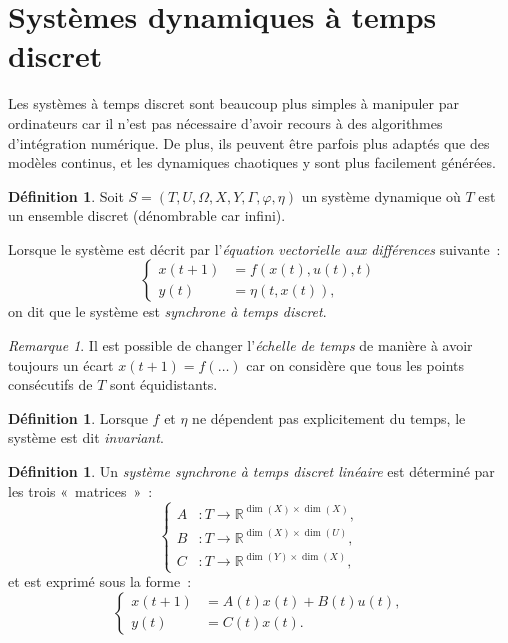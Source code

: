 \documentclass{article}
\theoremstyle{definition}
\newtheorem{déf}[thm]{Définition}
\theoremstyle{remark}
\newtheorem*{rmq}{Remarque}
\newcommand{\R}{\mathbb R}
\begin{document}
\section{Systèmes dynamiques à temps discret}
	Les systèmes à temps discret sont beaucoup plus simples à manipuler par ordinateurs car il n'est pas nécessaire d'avoir recours à des algorithmes
	d'intégration numérique. De plus, ils peuvent être parfois plus adaptés que des modèles continus, et les dynamiques chaotiques y sont plus facilement
	générées.

	\begin{déf} Soit $S = (T, U, \Omega, X, Y, \Gamma, \varphi, \eta)$ un système dynamique où $T$ est un ensemble discret (dénombrable car infini).

	Lorsque le système est décrit par l'\textit{équation vectorielle aux différences} suivante~:
	\[\begin{cases}
		x(t+1) &= f(x(t), u(t), t) \\
		y(t) &= \eta(t, x(t)),
	\end{cases}\]
	on dit que le système est \textit{synchrone à temps discret}.
	\end{déf}

	\begin{rmq} Il est possible de changer l'\textit{échelle de temps} de manière à avoir toujours un écart $x(t+1) = f(\ldots)$ car on considère que tous les
	points consécutifs de $T$ sont équidistants.
	\end{rmq}

	\begin{déf} Lorsque $f$ et $\eta$ ne dépendent pas explicitement du temps, le système est dit \textit{invariant}.
	\end{déf}

	\begin{déf} Un \textit{système synchrone à temps discret linéaire} est déterminé par les trois «~matrices~»~:
	\[\begin{cases}
		A &: T \to \R^{\dim(X) \times \dim(X)}, \\
		B &: T \to \R^{\dim(X) \times \dim(U)}, \\
		C &: T \to \R^{\dim(Y) \times \dim(X)},
	\end{cases}\]
	et est exprimé sous la forme~:
	\[\begin{cases}
		x(t+1) &= A(t)x(t) + B(t)u(t), \\
		y(t) &= C(t)x(t).
	\end{cases}\]
	\end{déf}
\end{document}
